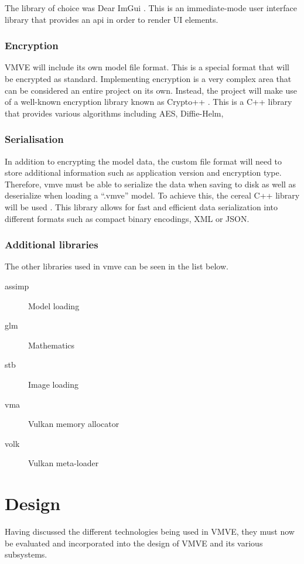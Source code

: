 \documentclass[11pt]{article}
\begin{document}
The library of choice was Dear ImGui \cite{imgui}. This is an immediate-mode
user interface library that provides an \gls{api} in order to render UI elements. 

\subsubsection{Encryption} \label{custom_file_format} VMVE will include its own
model file format. This is a special format that will be encrypted as standard.
Implementing encryption is a very complex area that can be considered an entire
project on its own. Instead, the project will make use of a well-known
encryption library known as Crypto++ \cite{cryptopp}. This is a C++ library that
provides various algorithms including AES, Diffie-Helm, 

\subsubsection{Serialisation}
In addition to encrypting the model data, the custom file format will need to
store additional information such as application version and encryption type.
Therefore, \gls{vmve} must be able to serialize the data when saving to disk as
well as deserialize when loading a ``.vmve'' model. To achieve this, the cereal
C++ library will be used \cite{cereal}. This library allows for fast and
efficient data serialization into different formats such as compact binary
encodings, XML or JSON.

\subsubsection{Additional libraries}
The other libraries used in \gls{vmve} can be seen in the list below.
\begin{description}
  \item[assimp] Model loading
  \item[glm] Mathematics
  \item[stb] Image loading
  \item[vma] Vulkan memory allocator
  \item[volk] Vulkan meta-loader
\end{description}

\section{Design}

Having discussed the different technologies being used in VMVE, they must now be
evaluated and incorporated into the design of VMVE and its various subsystems.
\end{document}
